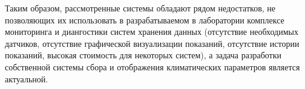 Таким образом, рассмотренные системы обладают рядом недостатков, не позволяющих их использовать в разрабатываемом в лаборатории комплексе мониторинга и диангостики систем хранения данных (отсутствие необходимых датчиков, отсутствие графической визуализации показаний, отсутствие истории показаний, высокая стоимость для некоторых систем), а задача разработки собственной системы сбора и отображения климатических параметров является актуальной.  





